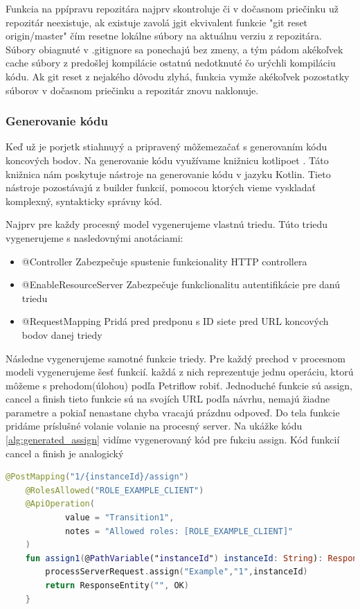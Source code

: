 Funkcia na ppípravu repozitára najprv skontroluje či v dočasnom priečinku už repozitár neexistuje, ak existuje zavolá jgit ekvivalent funkcie "git reset origin/master" čím resetne lokálne súbory na aktuálnu verziu z repozitára. Súbory obiagnuté v .gitignore sa ponechajú bez zmeny, a tým pádom akékoľvek cache súbory z predošlej kompilácie ostatnú nedotknuté čo urýchli kompiláciu kódu. Ak git reset z nejakého dôvodu zlyhá, funkcia vymže akékoľvek pozostatky súborov v dočasnom priečinku a repozitár znovu naklonuje.

\subsubsection{Generovanie kódu}
Keď už je porjetk stiahnuyý a pripravený môžemezačať s generovaním kódu koncových bodov. Na generovanie kódu  využívame knižnicu kotlipoet \cite{kotlipoet}. Táto knižnica nám poskytuje nástroje na generovanie kódu v jazyku Kotlin. Tieto nástroje pozostávajú z builder funkcií, pomocou ktorých vieme vyskladať komplexný, syntakticky správny kód.

Najprv pre každy procesný model vygenerujeme vlastnú triedu. Túto triedu vygenerujeme s nasledovnými anotáciami:
\begin{itemize}
	\item @Controller Zabezpečuje spustenie funkcionality HTTP controllera 
	\item @EnableResourceServer Zabezpečuje funkclionalitu autentifikácie pre danú triedu
	\item @RequestMapping Pridá pred predponu s ID siete pred URL koncových bodov danej triedy
\end{itemize}
Následne vygenerujeme samotné funkcie triedy. Pre každý prechod v procesnom modeli vygenerujeme šesť funkcií. každá z nich reprezentuje jednu operáciu, ktorú môžeme s prehodom(úlohou) podľa Petriflow robiť. 
Jednoduché funkcie sú assign, cancel a finish tieto funkcie sú na svojích URL podľa návrhu, nemajú žiadne parametre a pokiaľ nenastane chyba vracajú prázdnu odpoveď. Do tela funkcie pridáme príslušné volanie volanie na procesný server. Na ukážke kódu \ref{alg:generated_assign} vidíme vygenerovaný kód pre fukciu assign. Kód funkcií cancel a finish je analogický 

\begin{lstlisting}[float, caption={Príklad vygenerovanej funkcie},label={alg:generated_assign},language=Kotlin]
	@PostMapping("1/{instanceId}/assign")
	@RolesAllowed("ROLE_EXAMPLE_CLIENT")
	@ApiOperation(
			value = "Transition1",
			notes = "Allowed roles: [ROLE_EXAMPLE_CLIENT]"
	)
	fun assign1(@PathVariable("instanceId") instanceId: String): ResponseEntity<String> {
		processServerRequest.assign("Example","1",instanceId)
		return ResponseEntity("", OK)
	}
\end{lstlisting}


